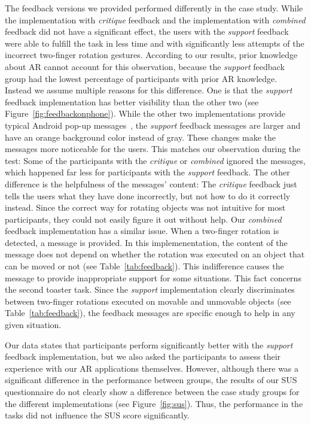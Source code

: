 \documentclass[manuscript]{acmart}
\begin{document}
			The feedback versions we provided performed differently in the case study. While the implementation with \emph{critique} feedback and the implementation with \emph{combined} feedback did not have a significant effect, the users with the \emph{support} feedback were able to fulfill the task in less time and with significantly less attempts of the incorrect two-finger rotation gestures. According to our results, prior knowledge about \ac{AR} cannot account for this observation, because the \emph{support} feedback group had the lowest percentage of participants with prior \ac{AR} knowledge. Instead we assume multiple reasons for this difference. One is that the \emph{support} feedback implementation has better visibility than the other two (see Figure~\ref{fig:feedbackonphone}). While the other two implementations provide typical Android pop-up messages~\cite{Toast2020}, the \emph{support} feedback messages are larger and have an orange background color instead of gray. These changes make the messages more noticeable for the users. This matches our observation during the test: Some of the participants with the \emph{critique} or \emph{combined} ignored the messages, which happened far less for participants with the \emph{support} feedback. The other difference is the helpfulness of the messages' content: The \emph{critique} feedback just tells the users what they have done incorrectly, but not how to do it correctly instead. Since the correct way for rotating objects was not intuitive for most participants, they could not easily figure it out without help. Our \emph{combined} feedback implementation has a similar issue. When a two-finger rotation is detected, a message is provided. In this implemenentation, the content of the message does not depend on whether the rotation was executed on an object that can be moved or not (see Table~\ref{tab:feedback}). This indifference causes the message to provide inappropriate support for some situations. This fact concerns the second toaster task. Since the \emph{support} implementation clearly discriminates between two-finger rotations executed on movable and unmovable objects (see Table~\ref{tab:feedback}), the feedback messages are specific enough to help in any given situation.

			Our data states that participants perform significantly better with the \emph{support} feedback implementation, but we also asked the participants to assess their experience with our \ac{AR} applications themselves. However, although there was a significant difference in the performance between groups, the results of our \ac{SUS} questionnaire do not clearly show a difference between the case study groups for the different implementations (see Figure~\ref{fig:sus}). Thus, the performance in the tasks did not influence the SUS score significantly. 
\end{document}
